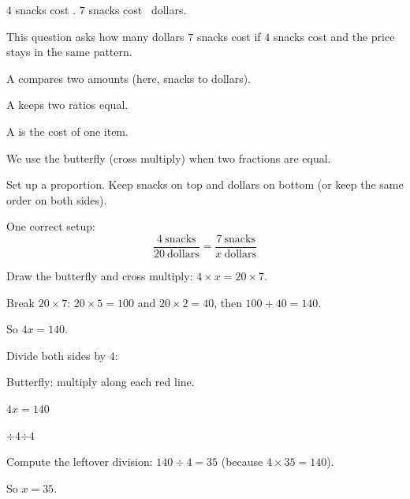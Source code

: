 \noindent $4$ snacks cost . $7$ snacks cost \blank[2.4cm]\ dollars.


\noindent This question asks how many dollars $7$ snacks cost if $4$ snacks
cost  and the price stays in the same pattern.

\begin{words}
  \item A compares two amounts (here, snacks to dollars).
  \item A keeps two ratios equal.
  \item A is the cost of one item.
  \item We use the butterfly (cross multiply) when two fractions are equal.
\end{words}

\begin{steps}
  \item Set up a proportion. Keep snacks on top and dollars on bottom (or keep the
        same order on both sides).
  \item One correct setup:
    \[ \frac{4\ \text{snacks}}{20\ \text{dollars}} = \frac{7\ \text{snacks}}{x\ \text{dollars}} \]
  \item Draw the butterfly and cross multiply: $4 \times x = 20 \times 7$.
  \item Break $20 \times 7$: $20 \times 5 = 100$ and $20 \times 2 = 40$, then
        $100 + 40 = 140$.
  \item So $4x = 140$.
  \item Divide both sides by $4$:
    \begin{center}
      \par\smallskip
      Butterfly: multiply along each red line.
      \par\medskip
      $4x = 140$
      \par\smallskip
      \underline{\textcolor{blue!60!black}{$\div 4$\qquad$\div 4$}}
    \end{center}
  \item Compute the leftover division: $140 \div 4 = 35$ (because
        $4 \times 35 = 140$).
  \item So $x = 35$.
\end{steps}


